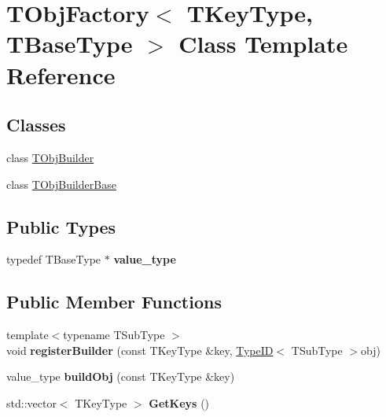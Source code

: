 \hypertarget{class_t_obj_factory}{\section{T\+Obj\+Factory$<$ T\+Key\+Type, T\+Base\+Type $>$ Class Template Reference}
\label{class_t_obj_factory}
}
\subsection*{Classes}
\begin{DoxyCompactItemize}
\item 
class \hyperlink{class_t_obj_factory_1_1_t_obj_builder}{T\+Obj\+Builder}
\item 
class \hyperlink{class_t_obj_factory_1_1_t_obj_builder_base}{T\+Obj\+Builder\+Base}
\end{DoxyCompactItemize}
\subsection*{Public Types}
\begin{DoxyCompactItemize}
\item 
\hypertarget{class_t_obj_factory_a61db300a7ce613ac5ae8f452e5bf02c8}{typedef T\+Base\+Type $\ast$ {\bfseries value\+\_\+type}}\label{class_t_obj_factory_a61db300a7ce613ac5ae8f452e5bf02c8}

\end{DoxyCompactItemize}
\subsection*{Public Member Functions}
\begin{DoxyCompactItemize}
\item 
\hypertarget{class_t_obj_factory_a14f39539e97e22e4fe143e1d8f2373f5}{{\footnotesize template$<$typename T\+Sub\+Type $>$ }\\void {\bfseries register\+Builder} (const T\+Key\+Type \&key, \hyperlink{class_type_i_d}{Type\+I\+D}$<$ T\+Sub\+Type $>$obj)}\label{class_t_obj_factory_a14f39539e97e22e4fe143e1d8f2373f5}

\item 
\hypertarget{class_t_obj_factory_a041ebde30f6cabf2d4fa014b51695f95}{value\+\_\+type {\bfseries build\+Obj} (const T\+Key\+Type \&key)}\label{class_t_obj_factory_a041ebde30f6cabf2d4fa014b51695f95}

\item 
\hypertarget{class_t_obj_factory_abc79532f7464c25b184a0c4094fb9625}{std\+::vector$<$ T\+Key\+Type $>$ {\bfseries Get\+Keys} ()}\label{class_t_obj_factory_abc79532f7464c25b184a0c4094fb9625}

\end{DoxyCompactItemize}
